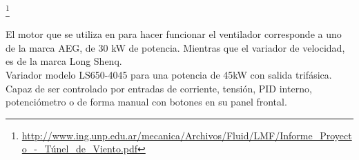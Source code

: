 			\footnote{\url{http://www.ing.unp.edu.ar/mecanica/Archivos/Fluid/LMF/Informe_Proyecto_-_Túnel_de_Viento.pdf}}
	\begin{minipage}[t]{.5\textwidth}
		
El motor que se utiliza en para hacer funcionar el ventilador corresponde a uno de la marca AEG, de 30 kW de potencia. Mientras que el variador de velocidad, es de la marca Long Shenq. \\
Variador modelo LS650-4045 para una potencia de 45kW con salida trifásica. Capaz de ser controlado por entradas de corriente, tensión, PID interno, potenciómetro o de forma manual con botones en su panel frontal.
	\end{minipage}	
	\begin{minipage}[t]{.5\textwidth}
		\centering{}
		\label{fig:LS650}
	\end{minipage}

		
		\newpage